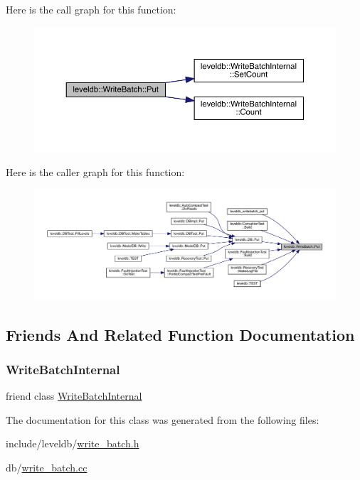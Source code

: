 Here is the call graph for this function\+:
\nopagebreak
\begin{figure}[H]
\begin{center}
\leavevmode
\includegraphics[width=350pt]{classleveldb_1_1_write_batch_a30770379143a7ccb4ede18ddf0e45bf3_cgraph}
\end{center}
\end{figure}
Here is the caller graph for this function\+:
\nopagebreak
\begin{figure}[H]
\begin{center}
\leavevmode
\includegraphics[width=350pt]{classleveldb_1_1_write_batch_a30770379143a7ccb4ede18ddf0e45bf3_icgraph}
\end{center}
\end{figure}


\subsection{Friends And Related Function Documentation}
\mbox{\label{classleveldb_1_1_write_batch_a0c491f15816190f8235ccd1367d5ae5f}} 
\subsubsection{\texorpdfstring{WriteBatchInternal}{WriteBatchInternal}}
{\footnotesize\ttfamily friend class \mbox{\hyperlink{classleveldb_1_1_write_batch_internal}{Write\+Batch\+Internal}}\hspace{0.3cm}{\ttfamily [friend]}}



The documentation for this class was generated from the following files\+:\begin{DoxyCompactItemize}
\item 
include/leveldb/\mbox{\hyperlink{write__batch_8h}{write\+\_\+batch.\+h}}\item 
db/\mbox{\hyperlink{write__batch_8cc}{write\+\_\+batch.\+cc}}\end{DoxyCompactItemize}
